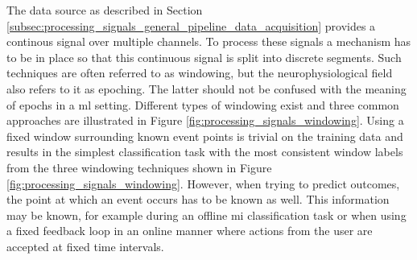 The data source as described in Section \ref{subsec:processing_signals_general_pipeline_data_acquisition} provides a continous signal over multiple channels.
To process these signals a mechanism has to be in place so that this continuous signal is split into discrete segments.
Such techniques are often referred to as windowing, but the neurophysiological field also refers to it as epoching.
The latter should not be confused with the meaning of epochs in a \gls{ml} setting.
Different types of windowing exist and three common approaches are illustrated in Figure \ref{fig:processing_signals_windowing}.
Using a fixed window surrounding known event points is trivial on the training data and results in the simplest classification task with the most consistent window labels from the three windowing techniques shown in Figure \ref{fig:processing_signals_windowing}.
However, when trying to predict outcomes, the point at which an event occurs has to be known as well.
This information may be known, for example during an offline \gls{mi} classification task or when using a fixed feedback loop in an online manner where actions from the user are accepted at fixed time intervals.

